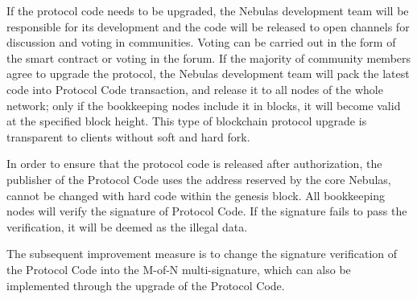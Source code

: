 If the protocol code needs to be upgraded, the Nebulas development team will be responsible for its development and the code will be released to open channels for discussion and voting in communities. Voting can be carried out in the form of the smart contract or voting in the forum. If the majority of community members agree to upgrade the protocol, the Nebulas development team will pack the latest code into Protocol Code transaction, and release it to all nodes of the whole network; only if the bookkeeping nodes include it in blocks, it will become valid at the specified block height. This type of blockchain protocol upgrade is transparent to clients without soft and hard fork.

In order to ensure that the protocol code is released after authorization, the publisher of the Protocol Code uses the address reserved by the core Nebulas, cannot be changed with hard code within the genesis block. All bookkeeping nodes will verify the signature of Protocol Code. If the signature fails to pass the verification, it will be deemed as the illegal data.

The subsequent improvement measure is to change the signature verification of the Protocol Code into the M-of-N multi-signature, which can also be implemented through the upgrade of the Protocol Code.